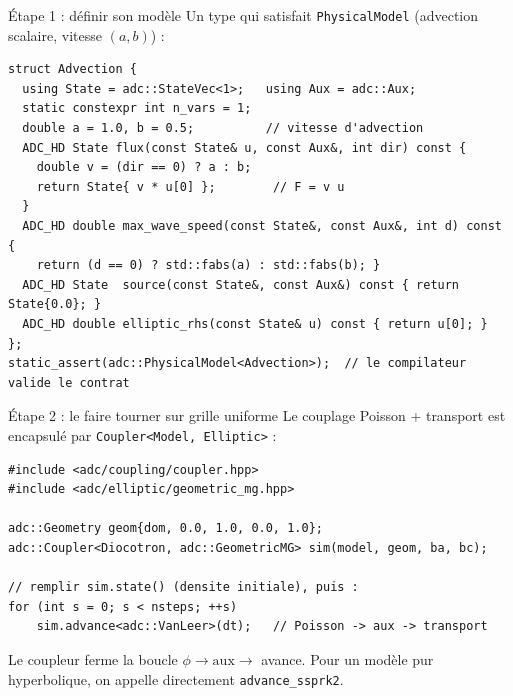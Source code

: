 \documentclass[11pt,aspectratio=169]{beamer}
\begin{document}
\begin{frame}[fragile]{Étape 1 : définir son modèle}
Un type qui satisfait \texttt{PhysicalModel} (advection scalaire, vitesse $(a,b)$) :

\vspace{-0.4em}
\begin{lstlisting}[basicstyle=\ttfamily\footnotesize]
struct Advection {
  using State = adc::StateVec<1>;   using Aux = adc::Aux;
  static constexpr int n_vars = 1;
  double a = 1.0, b = 0.5;          // vitesse d'advection
  ADC_HD State flux(const State& u, const Aux&, int dir) const {
    double v = (dir == 0) ? a : b;
    return State{ v * u[0] };        // F = v u
  }
  ADC_HD double max_wave_speed(const State&, const Aux&, int d) const {
    return (d == 0) ? std::fabs(a) : std::fabs(b); }
  ADC_HD State  source(const State&, const Aux&) const { return State{0.0}; }
  ADC_HD double elliptic_rhs(const State& u) const { return u[0]; }
};
static_assert(adc::PhysicalModel<Advection>);  // le compilateur valide le contrat
\end{lstlisting}
\end{frame}

\begin{frame}[fragile]{Étape 2 : le faire tourner sur grille uniforme}
Le couplage Poisson + transport est encapsulé par \texttt{Coupler<Model, Elliptic>} :

\begin{lstlisting}
#include <adc/coupling/coupler.hpp>
#include <adc/elliptic/geometric_mg.hpp>

adc::Geometry geom{dom, 0.0, 1.0, 0.0, 1.0};
adc::Coupler<Diocotron, adc::GeometricMG> sim(model, geom, ba, bc);

// remplir sim.state() (densite initiale), puis :
for (int s = 0; s < nsteps; ++s)
    sim.advance<adc::VanLeer>(dt);   // Poisson -> aux -> transport
\end{lstlisting}

\vspace{0.3em}
\small Le coupleur ferme la boucle $\phi \to \mathrm{aux} \to$ avance. Pour un modèle
pur hyperbolique, on appelle directement \texttt{advance\_ssprk2}.
\end{frame}
\end{document}
